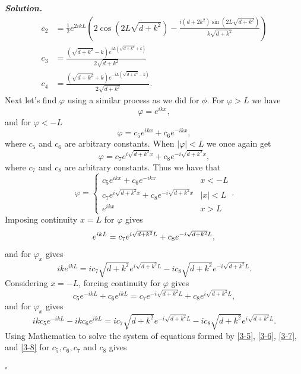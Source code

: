 \documentclass[12pt]{report}
\newenvironment{solution}[1][\it{Solution}]{\textbf{#1. } }{$\square$}
\begin{document}
\begin{solution}
\begin{align*}
        c_2 &= \frac{1}{2}e^{2 i k L}\left(2 \cos \left(2 L \sqrt{d+k^2}\right)-\frac{i \left(d+2 k^2\right) \sin \left(2 L \sqrt{d+k^2}\right)}{k \sqrt{d+k^2}}\right)\\
        c_3 &= \frac{\left(\sqrt{d+k^2}-k\right) e^{i L \left(\sqrt{d+k^2}+k\right)}}{2 \sqrt{d+k^2}}\\
        c_4 &=\frac{\left(\sqrt{d+k^2}+k\right) e^{-i L \left(\sqrt{d+k^2}-k\right)}}{2 \sqrt{d+k^2}}.
    \end{align*}
    Next let's find $\varphi$ using a similar process as we did for $\phi$. For $\varphi > L$ we have
    \[
        \varphi = e^{ikx},
    \] 
    and for $\varphi < -L$
    \[
        \varphi = c_5 e^{ikx} + c_6 e^{-ikx},
    \]
    where $c_5$ and $c_6$ are arbitrary constants. When $|\varphi|  < L$ we once again get
    \[ 
        \varphi = c_7e^{i\sqrt{d + k^2}x} + c_8e^{-i\sqrt{d + k^2}x},
    \]
    where $c_7$ and $c_8$ are arbitrary constants. Thus we have that
    \[ 
        \varphi =
        \begin{cases}
            c_5 e^{ikx} + c_6 e^{-ikx} &x < -L\\
            c_7e^{i\sqrt{d + k^2}x} + c_8e^{-i\sqrt{d + k^2}x} &|x| < L\\
            e^{ikx} &x > L
        \end{cases}.
    \]
    Imposing continuity $x=L$ for $\varphi$ gives
    \begin{equation} \label{3-5}
        e^{ikL} = c_7e^{i\sqrt{d+k^2}L} + c_8e^{-i\sqrt{d + k^2}L},\\
    \end{equation}
    and for $\varphi_x$ gives
    \begin{equation} \label{3-6}
        ike^{ikL} = ic_7\sqrt{d + k^2}e^{i\sqrt{d + k^2}L} - ic_8\sqrt{d +k^2}e^{-i\sqrt{d + k^2}L}.
    \end{equation}
    Considering $x = -L$, forcing continuity for $\varphi$ gives
    \begin{equation} \label{3-7}
        c_5e^{-ikL} + c_6e^{ikL} = c_7e^{-i\sqrt{d +k^2}L} + c_8e^{i\sqrt{d + k^2}L},
    \end{equation}
    and for $\varphi_x$ gives
    \begin{equation} \label{3-8}
        ikc_5e^{-ikL} - ikc_6e^{ikL} = ic_7\sqrt{d +k^2}e^{-i\sqrt{d + k^2}L} - ic_8 \sqrt{d +k^2}e^{i\sqrt{d+k^2}L}.
    \end{equation}
    Using Mathematica to solve the system of equations formed by \ref{3-5}, \ref{3-6}, \ref{3-7}, and \ref{3-8} for $c_5,c_6,c_7$ and $c_8$  gives

\end{solution}
\end{document}

